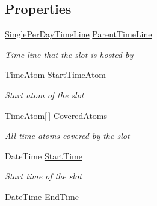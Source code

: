 \subsection*{Properties}
\begin{DoxyCompactItemize}
\item 
\hyperlink{class_general_health_care_elements_1_1_booking_models_1_1_single_per_day_time_line}{Single\+Per\+Day\+Time\+Line} \hyperlink{class_general_health_care_elements_1_1_booking_models_1_1_slot_aa5833a76b9e2b9c46b76a4a772af18d8}{Parent\+Time\+Line}
\begin{DoxyCompactList}\small\item\em Time line that the slot is hosted by \end{DoxyCompactList}\item 
\hyperlink{class_general_health_care_elements_1_1_booking_models_1_1_time_atom}{Time\+Atom} \hyperlink{class_general_health_care_elements_1_1_booking_models_1_1_slot_a96b73738a63d0bef0b27377088099c36}{Start\+Time\+Atom}
\begin{DoxyCompactList}\small\item\em Start atom of the slot \end{DoxyCompactList}\item 
\hyperlink{class_general_health_care_elements_1_1_booking_models_1_1_time_atom}{Time\+Atom}\mbox{[}$\,$\mbox{]} \hyperlink{class_general_health_care_elements_1_1_booking_models_1_1_slot_ad6d6f3281c164dd8feee7c25fceb9b42}{Covered\+Atoms}
\begin{DoxyCompactList}\small\item\em All time atoms covered by the slot \end{DoxyCompactList}\item 
Date\+Time \hyperlink{class_general_health_care_elements_1_1_booking_models_1_1_slot_a385977f2e257d3e0e290f37750a214b9}{Start\+Time}
\begin{DoxyCompactList}\small\item\em Start time of the slot \end{DoxyCompactList}\item 
Date\+Time \hyperlink{class_general_health_care_elements_1_1_booking_models_1_1_slot_a9d74c521934c63288b0d237caaf7ff94}{End\+Time}

\end{DoxyCompactItemize}
